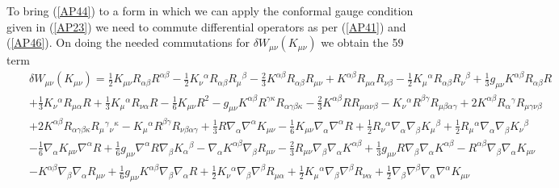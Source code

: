 \documentclass[aps]{revtex4}
\begin{document}
To bring (\ref{AP44}) to a form in which we can apply the conformal gauge condition given in (\ref{AP23}) we need to commute differential operators as per (\ref{AP41}) and (\ref{AP46}).  On doing the needed commutations for $\delta W_{\mu\nu}^{}(K_{\mu\nu})$ we obtain the 59 term
%
\begin{eqnarray}
&&\delta W_{\mu\nu}^{}(K_{\mu\nu})=\tfrac{1}{2} K_{\mu \nu} R_{\alpha \beta} R^{\alpha \beta} -  \tfrac{1}{2} K_{\nu}{}^{\alpha} R_{\alpha \beta} R_{\mu}{}^{\beta} -  \tfrac{2}{3} K^{\alpha \beta} R_{\alpha \beta} R_{\mu \nu} + K^{\alpha \beta} R_{\mu \alpha} R_{\nu \beta} -  \tfrac{1}{2} K_{\mu}{}^{\alpha} R_{\alpha \beta} R_{\nu}{}^{\beta} + \tfrac{1}{3} g_{\mu \nu} K^{\alpha \beta} R_{\alpha \beta} R 
\nonumber\\
&&+ \tfrac{1}{3} K_{\nu}{}^{\alpha} R_{\mu \alpha} R + \tfrac{1}{3} K_{\mu}{}^{\alpha} R_{\nu \alpha} R -  \tfrac{1}{6} K_{\mu \nu} R^2 -  g_{\mu \nu} K^{\alpha \beta} R^{\gamma \kappa} R_{\alpha \gamma \beta \kappa} -  \tfrac{2}{3} K^{\alpha \beta} R R_{\mu \alpha \nu \beta} -  K_{\nu}{}^{\alpha} R^{\beta \gamma} R_{\mu \beta \alpha \gamma} + 2 K^{\alpha \beta} R_{\alpha}{}^{\gamma} R_{\mu \gamma \nu \beta} 
\nonumber\\
&&+ 2 K^{\alpha \beta} R_{\alpha \gamma \beta \kappa} R_{\mu}{}^{\gamma}{}_{\nu}{}^{\kappa} -  K_{\mu}{}^{\alpha} R^{\beta \gamma} R_{\nu \beta \alpha \gamma} + \tfrac{1}{3} R \nabla_{\alpha}\nabla^{\alpha}K_{\mu \nu} -  \tfrac{1}{6} K_{\mu \nu} \nabla_{\alpha}\nabla^{\alpha}R + \tfrac{1}{2} R_{\nu}{}^{\alpha} \nabla_{\alpha}\nabla_{\beta}K_{\mu}{}^{\beta} + \tfrac{1}{2} R_{\mu}{}^{\alpha} \nabla_{\alpha}\nabla_{\beta}K_{\nu}{}^{\beta} 
\nonumber\\
&&-  \tfrac{1}{6} \nabla_{\alpha}K_{\mu \nu} \nabla^{\alpha}R + \tfrac{1}{6} g_{\mu \nu} \nabla^{\alpha}R \nabla_{\beta}K_{\alpha}{}^{\beta} -  \nabla_{\alpha}K^{\alpha \beta} \nabla_{\beta}R_{\mu \nu} -  \tfrac{2}{3} R_{\mu \nu} \nabla_{\beta}\nabla_{\alpha}K^{\alpha \beta} + \tfrac{1}{3} g_{\mu \nu} R \nabla_{\beta}\nabla_{\alpha}K^{\alpha \beta} -  R^{\alpha \beta} \nabla_{\beta}\nabla_{\alpha}K_{\mu \nu} 
\nonumber\\
&&-  K^{\alpha \beta} \nabla_{\beta}\nabla_{\alpha}R_{\mu \nu} + \tfrac{1}{6} g_{\mu \nu} K^{\alpha \beta} \nabla_{\beta}\nabla_{\alpha}R + \tfrac{1}{2} K_{\nu}{}^{\alpha} \nabla_{\beta}\nabla^{\beta}R_{\mu \alpha} + \tfrac{1}{2} K_{\mu}{}^{\alpha} \nabla_{\beta}\nabla^{\beta}R_{\nu \alpha} + \tfrac{1}{2} \nabla_{\beta}\nabla^{\beta}\nabla_{\alpha}\nabla^{\alpha}K_{\mu \nu} 

\end{eqnarray}
\end{document}
